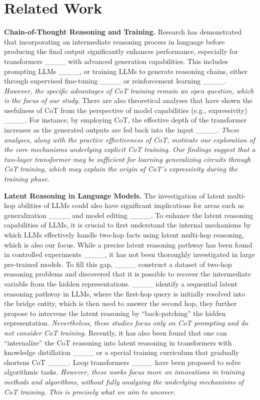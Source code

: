 \section{Related Work}
\textbf{Chain-of-Thought Reasoning and Training.} Research has demonstrated that incorporating an intermediate reasoning process in language before producing the final output significantly enhances performance, especially for transformers ____ with advanced generation capabilities. This includes prompting LLMs ____, or training LLMs to generate reasoning chains, either through supervised fine-tuning ____ or reinforcement learning ____. \textit{However, the specific advantages of CoT training remain an open question, which is the focus of our study}. There are also theoretical analyses that have shown the usefulness of CoT from the perspective of model capabilities (e.g., expressivity) ____. For instance, by employing CoT, the effective depth of the transformer increases as the generated outputs are fed back into the input ____. \textit{These analyses, along with the practice effectiveness of CoT, motivate our exploration of the core mechanisms underlying explicit CoT training. Our findings suggest that a two-layer transformer may be sufficient for learning generalizing circuits through CoT training, which may explain the origin of CoT's expressivity during the training phase.}

\textbf{Latent Reasoning in Language Models.} The investigation of latent multi-hop abilities of LLMs could also have significant implications for areas such as generalization ____ and model editing ____. To enhance the latent reasoning capabilities of LLMs, it is crucial to first understand the internal mechanisms by which LLMs effectively handle two-hop facts using latent multi-hop reasoning, which is also our focus. While a precise latent reasoning pathway has been found in controlled experiments ____, it has not been thoroughly investigated in large pre-trained models. To fill this gap, ____ construct a dataset of two-hop reasoning problems and discovered that it is possible to recover the intermediate variable from the hidden representations. ____ identify a sequential latent reasoning pathway in LLMs, where the first-hop query is initially resolved into the bridge entity, which is then used to answer the second hop, they further propose to intervene the latent reasoning by “back-patching” the hidden representation. \textit{Nevertheless, these studies focus only on CoT prompting and do not consider CoT training.} Recently, it has also been found that one can “internalize” the CoT reasoning into latent reasoning in transformers with knowledge distillation ____ or a special training curriculum that gradually shortens
CoT ____. Loop transformers ____ have been proposed to solve algorithmic tasks. \textit{However, these works focus more on innovations in training methods and algorithms, without fully analyzing the underlying mechanisms of CoT training. This is precisely what we aim to uncover}.
\newpage